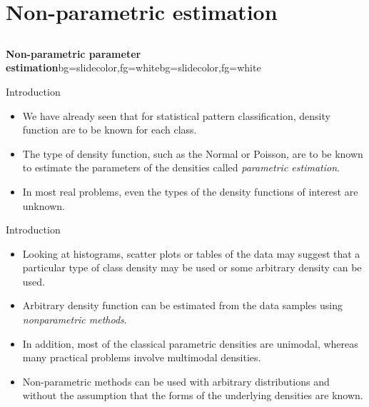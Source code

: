 \section{Non-parametric estimation}
\subsection{}

\begin{frame}{}
\begin{variableblock}{\centering \Large \textbf{\vspace{4pt}\newline Non-parametric parameter estimation\vspace{4pt}}}{bg=slidecolor,fg=white}{bg=slidecolor,fg=white}
\end{variableblock}
\end{frame}

\begin{frame}{Introduction}
\begin{itemize}
\setlength{\itemsep}{12pt}
\item We have already seen that for statistical pattern classification, density function are to be known for each class.
\item The type of density function, such as the Normal or Poisson, are to be known to estimate the parameters of the densities called \textit{\color{mycolor1}parametric estimation}.
\item In most real problems, even the types of the density functions of interest are unknown.
\end{itemize}
\end{frame}

\begin{frame}{Introduction}
\begin{itemize}
\setlength{\itemsep}{8pt}
\item Looking at histograms, scatter plots or tables of the data may suggest that a particular type of class density may be used or {\color{mycolor2}some arbitrary density} can be used.
\item Arbitrary density function can be estimated from the data samples using \textit{\color{mycolor1}nonparametric methods}.
\item  In addition, most of the classical parametric densities are
{\color{mycolor2}unimodal}, whereas many practical problems involve {\color{mycolor2}multimodal} densities.
\item Non-parametric methods can be used with arbitrary
distributions and without the assumption that the forms of
the underlying densities are known.
\end{itemize}
\end{frame}


